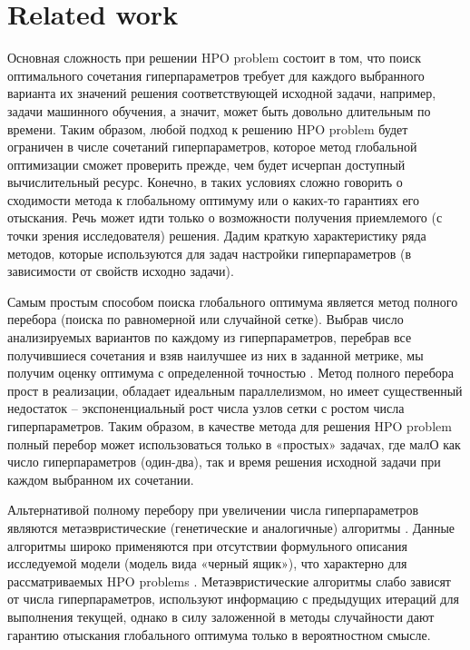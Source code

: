 \documentclass[preprint,12pt]{elsarticle}
\begin{document}
\section{Related work}
\label{sec_rel}

Основная сложность при решении HPO problem состоит в том, что поиск оптимального сочетания гиперпараметров требует для каждого выбранного варианта их значений решения соответствующей исходной задачи, например, задачи машинного обучения, а значит, может быть довольно длительным по времени. Таким образом, любой подход к решению HPO problem будет ограничен в числе сочетаний гиперпараметров, которое метод глобальной оптимизации сможет проверить прежде, чем будет исчерпан доступный вычислительный ресурс. Конечно, в таких условиях сложно говорить о сходимости метода к глобальному оптимуму или о каких-то гарантиях его отыскания. Речь может идти только о возможности получения приемлемого (с точки зрения исследователя) решения. Дадим краткую характеристику ряда методов, которые используются для задач настройки гиперпараметров (в зависимости от свойств исходно задачи).

Самым простым способом поиска глобального оптимума является метод полного перебора (поиска по равномерной \cite{Bao2006} или случайной \cite{Bergstra2012} сетке). Выбрав число анализируемых вариантов по каждому из гиперпараметров, перебрав все получившиеся сочетания и взяв наилучшее из них в заданной метрике, мы получим оценку оптимума с определенной точностью \cite{Nevendra2022}. Метод полного перебора прост в реализации, обладает идеальным параллелизмом, но имеет существенный недостаток – экспоненциальный рост числа узлов сетки с ростом числа гиперпараметров. Таким образом, в качестве метода для решения HPO problem полный перебор может использоваться только в «простых» задачах, где малО как число гиперпараметров (один-два), так и время решения исходной задачи при каждом выбранном их сочетании.

Альтернативой полному перебору при увеличении числа гиперпараметров являются метаэвристические (генетические и аналогичные) алгоритмы \cite{Opara2019}. Данные алгоритмы широко применяются при отсутствии формульного описания исследуемой модели (модель вида «черный ящик»), что характерно для рассматриваемых HPO problems \cite{Zhou2021,Yang2022}. Метаэвристические алгоритмы слабо зависят от числа гиперпараметров, используют информацию с предыдущих итераций для выполнения текущей, однако в силу заложенной в методы случайности дают гарантию отыскания глобального оптимума только в вероятностном смысле.
\end{document}
